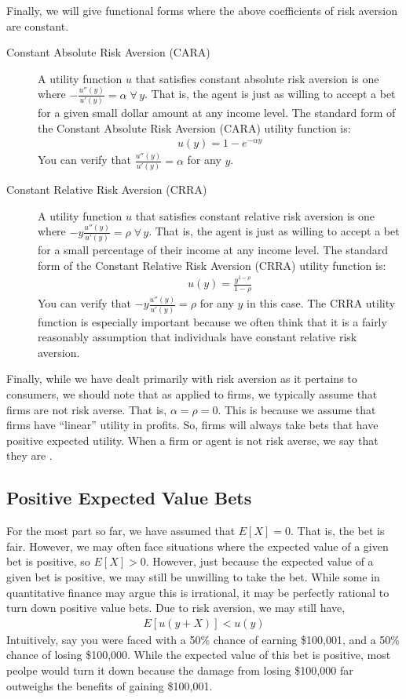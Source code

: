 Finally, we will give functional forms where the above coefficients of risk aversion are constant. 
\begin{description}
    \item[Constant Absolute Risk Aversion (CARA)] A utility function $u$ that satisfies constant absolute risk aversion is one where $-\frac{u''(y)}{u'(y)} = \alpha \; \forall \, y$. That is, the agent is just as willing to accept a bet for a given small dollar amount at any income level. The standard form of the Constant Absolute Risk Aversion (CARA) utility function is:
    \begin{align*}
        u(y) = 1 - e^{-\alpha y}
    \end{align*} 
    You can verify that $\frac{u''(y)}{u'(y)} = \alpha$ for any $y$. 
    \item[Constant Relative Risk Aversion (CRRA)] A utility function $u$ that satisfies constant relative risk aversion is one where $-y \frac{u''(y)}{u'(y)} = \rho \; \forall \, y$. That is, the agent is just as willing to accept a bet for a small percentage of their income at any income level. The standard form of the Constant Relative Risk Aversion (CRRA) utility function is: 
    \begin{align*}
        u(y) = \frac{y^{1 - \rho}}{1 - \rho}
    \end{align*} 
    You can verify that $-y\frac{u''(y)}{u'(y)} = \rho$ for any $y$ in this case. The CRRA utility function is especially important because we often think that it is a fairly reasonably assumption that individuals have constant relative risk aversion. 
\end{description}

Finally, while we have dealt primarily with risk aversion as it pertains to consumers, we should note that as applied to firms, we typically assume that firms are not risk averse. That is, $\alpha = \rho = 0$. This is because we assume that firms have ``linear'' utility in profits. So, firms will always take bets that have positive expected utility. When a firm or agent is not risk averse, we say that they are .  

\subsection*{Positive Expected Value Bets}
For the most part so far, we have assumed that $E[X] = 0$. That is, the bet is fair. However, we may often face situations where the expected value of a given bet is positive, so $E[X] > 0$. However, just because the expected value of a given bet is positive, we may still be unwilling to take the bet. While some in quantitative finance may argue this is irrational, it may be perfectly rational to turn down positive value bets. Due to risk aversion, we may still have,
\begin{align*}
    E[u(y + X)] < u(y)
\end{align*}
Intuitively, say you were faced with a 50\% chance of earning \$100,001, and a 50\% chance of losing \$100,000. While the expected value of this bet is positive, most peolpe would turn it down because the damage from losing \$100,000 far outweighs the benefits of gaining \$100,001. 

